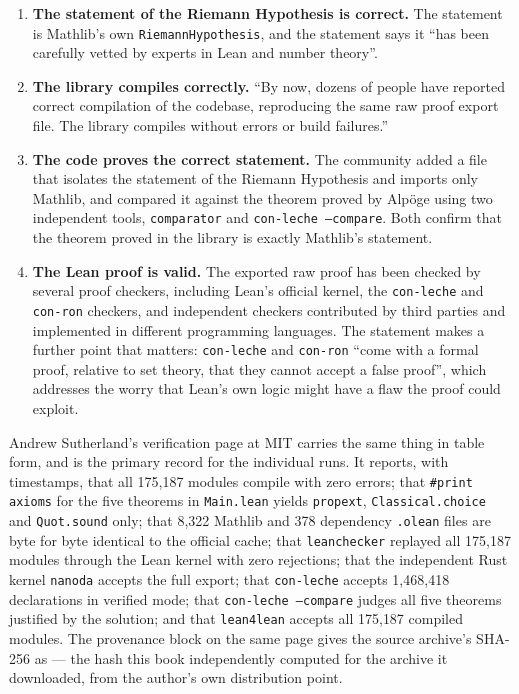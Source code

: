\begin{enumerate}
\item \textbf{The statement of the Riemann Hypothesis is correct.} The
statement is Mathlib's own \texttt{RiemannHypothesis}, and the statement says
it ``has been carefully vetted by experts in Lean and number theory''.

\item \textbf{The library compiles correctly.} ``By now, dozens of people have
reported correct compilation of the codebase, reproducing the same raw proof
export file. The library compiles without errors or build failures.''

\item \textbf{The code proves the correct statement.} The community added a
file that isolates the statement of the Riemann Hypothesis and imports only
Mathlib, and compared it against the theorem proved by Alpöge using two
independent tools, \texttt{comparator} and \texttt{con-leche --compare}.
Both confirm that the theorem proved in the library is exactly Mathlib's
statement.

\item \textbf{The Lean proof is valid.} The exported raw proof has been
checked by several proof checkers, including Lean's official kernel, the
\texttt{con-leche} and \texttt{con-ron} checkers, and independent checkers
contributed by third parties and implemented in different programming
languages. The statement makes a further point that matters: \texttt{con-leche}
and \texttt{con-ron} ``come with a formal proof, relative to set theory, that
they cannot accept a false proof'', which addresses the worry that Lean's own
logic might have a flaw the proof could exploit.
\end{enumerate}

Andrew Sutherland's verification page at MIT carries the same thing in table
form, and is the primary record for the individual runs. It reports, with
timestamps, that all 175{,}187 modules compile with zero errors; that
\texttt{\#print axioms} for the five theorems in \texttt{Main.lean} yields
\texttt{propext}, \texttt{Classical.choice} and \texttt{Quot.sound} only; that
8{,}322 Mathlib and 378 dependency \texttt{.olean} files are byte for byte
identical to the official cache; that \texttt{leanchecker} replayed all
175{,}187 modules through the Lean kernel with zero rejections; that the
independent Rust kernel \texttt{nanoda} accepts the full export; that
\texttt{con-leche} accepts 1{,}468{,}418 declarations in verified mode; that
\texttt{con-leche --compare} judges all five theorems justified by the
solution; and that \texttt{lean4lean} accepts all 175{,}187 compiled modules.
The provenance block on the same page gives the source archive's SHA-256 as
 ---
the hash this book independently computed for the archive it downloaded, from
the author's own distribution point.

